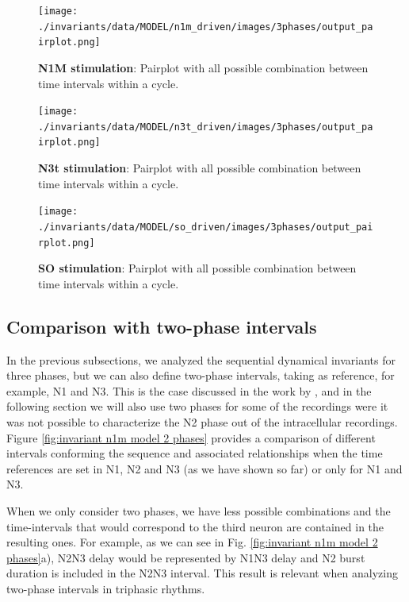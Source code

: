 \begin{figure}[htbp]
	\centering
	\texttt{[image: ./invariants/data/MODEL/n1m\_driven/images/3phases/output\_pairplot.png]}
	\caption{\textbf{N1M stimulation}: Pairplot with all possible combination between time intervals within a cycle.}
	\label{fig:model n1m stimulation pairplot}
\end{figure}
 
\begin{figure}[htbp]
	\centering
	\texttt{[image: ./invariants/data/MODEL/n3t\_driven/images/3phases/output\_pairplot.png]}
	\caption{\textbf{N3t stimulation}: Pairplot with all possible combination between time intervals within a cycle.}
	\label{fig:model n3t stimulation pairplot}
\end{figure}

\begin{figure}[htbp]
	\centering
	\texttt{[image: ./invariants/data/MODEL/so\_driven/images/3phases/output\_pairplot.png]}
	\caption{\textbf{SO stimulation}: Pairplot with all possible combination between time intervals within a cycle.}
	\label{fig:model so stimulation pairplot}
\end{figure}

%
\newpage
\subsection{Comparison with two-phase intervals}
In the previous subsections, we analyzed the sequential dynamical invariants for three phases, but we can also define two-phase intervals, taking as reference, for example, N1 and N3. This is the case discussed in the work by \textcite{elices_robust_2019}, and in the following section we will also use two phases for some of the recordings were it was not possible to characterize the N2 phase out of the intracellular recordings. Figure \ref{fig:invariant n1m model 2 phases} provides a comparison of  different intervals conforming the sequence and associated relationships when the time references are set in N1, N2 and N3 (as we have shown so far) or only for N1 and N3.

When we only consider two phases, we have less possible combinations and the time-intervals that would correspond to the third neuron are contained in the resulting ones. For example, as we can see in Fig. \ref{fig:invariant n1m model 2 phases}a), N2N3 delay would be represented by N1N3 delay and N2 burst duration is included in the N2N3 interval. This result is relevant when analyzing two-phase intervals in triphasic rhythms.


